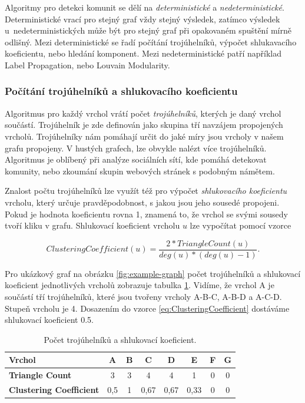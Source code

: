 \documentclass[
  program=infoi,
  biblatex=true,
  figures=true,
  glossaries=false,
  index,
  sourcecodes=true
]{kidiplom}
\begin{document}
Algoritmy pro detekci komunit se dělí na \textit{deterministické} a \textit{nedeterministické}. Deterministické vrací pro stejný graf vždy stejný výsledek, zatímco výsledek u~nedeterministických může být pro stejný graf při opakovaném spuštění mírně odlišný. Mezi deterministické se řadí počítání trojúhelníků, výpočet shlukavacího koeficientu, nebo hledání komponent. Mezi nedeterministické patří například Label Propagation, nebo Louvain Modularity.

\subsubsection{Počítání trojúhelníků a shlukovacího koeficientu}
Algoritmus pro každý vrchol vrátí počet \textit{trojúhelníků}, kterých je daný vrchol součástí. Trojúhelník je zde definován jako skupina tří navzájem propojených vrcholů. Trojúhelníky nám pomáhají určit do jaké míry jsou vrcholy v našem grafu propojeny. V hustých grafech, lze obvykle nalézt více trojúhelníků. Algoritmus je oblíbený při analýze sociálních sítí, kde pomáhá detekovat komunity, nebo zkoumání skupin webových stránek s podobným námětem.

Znalost počtu trojúhelníků lze využít též pro výpočet \textit{shlukovacího koeficientu} vrcholu, který určuje pravděpodobnost, s jakou jsou jeho sousedé propojeni. Pokud je hodnota koeficientu rovna 1, znamená to, že vrchol se svými sousedy tvoří kliku v grafu. Shlukovací koeficient vrcholu $u$ lze vypočítat pomocí vzorce

\begin{equation} 
\label{eq:ClusteringCoefficient}
ClusteringCoefficient(u) = \frac{2 * TriangleCount(u)}{deg(u) * (deg(u) - 1)}.
\end{equation}

Pro ukázkový graf na obrázku \ref{fig:example-graph} počet trojúhelníků a shlukovací koeficient jednotlivých vrcholů zobrazuje tabulka \ref{tab:triangles}. Vidíme, že vrchol A je součástí tří trojúhelníků, které jsou tvořeny vrcholy A-B-C, A-B-D a A-C-D. Stupeň vrcholu je 4. Dosazením do vzorce \ref{eq:ClusteringCoefficient} dostáváme shlukovací koeficient 0.5.

\begin{table}[h]
\begin{center}
\caption{Počet trojúhelníků a shlukovací koeficient.}
\label{tab:triangles}
\begin{tabular}{ | l || c | c | c | c | c | c | c | }
 \hline
 \textbf{Vrchol} & A & B & C & D & E & F & G \\
 \hline
 \textbf{Triangle Count} & 3 & 3 & 4 & 4 & 1 & 0 & 0 \\
 \hline
 \textbf{Clustering Coefficient} & 0,5 & 1 & 0,67 & 0,67 & 0,33 & 0 & 0 \\
 \hline
\end{tabular}
\end{center}
\end{table}
\end{document}
